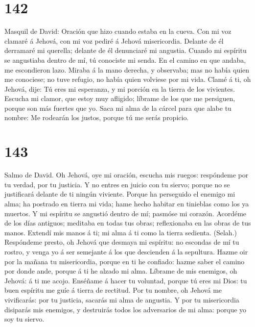 \hypertarget{section-141}{%
\section{142}\label{section-141}}

 Masquil de David: Oración que hizo cuando estaba en la
cueva. Con mi voz clamaré á Jehová, con mi voz pediré á Jehová
misericordia.  Delante de él derramaré mi querella;
delante de él denunciaré mi angustia.  Cuando mi espíritu
se angustiaba dentro de mí, tú conociste mi senda. En el camino en que
andaba, me escondieron lazo.  Miraba á la mano derecha, y
observaba; mas no había quien me conociese; no tuve refugio, no había
quien volviese por mi vida.  Clamé á ti, oh Jehová, dije:
Tú eres mi esperanza, y mi porción en la tierra de los vivientes.
 Escucha mi clamor, que estoy muy afligido; líbrame de los
que me persiguen, porque son más fuertes que yo.  Saca mi
alma de la cárcel para que alabe tu nombre: Me rodearán los justos,
porque tú me serás propicio.

\hypertarget{section-142}{%
\section{143}\label{section-142}}

 Salmo de David. Oh Jehová, oye mi oración, escucha mis
ruegos: respóndeme por tu verdad, por tu justicia.  Y no
entres en juicio con tu siervo; porque no se justificará delante de ti
ningún viviente.  Porque ha perseguido el enemigo mi alma;
ha postrado en tierra mi vida; hame hecho habitar en tinieblas como los
ya muertos.  Y mi espíritu se angustió dentro de mí;
pasmóse mi corazón.  Acordéme de los días antiguos;
meditaba en todas tus obras; reflexionaba en las obras de tus manos.
 Extendí mis manos á ti; mi alma á ti como la tierra
sedienta. (Selah.)  Respóndeme presto, oh Jehová que
desmaya mi espíritu: no escondas de mí tu rostro, y venga yo á ser
semejante á los que descienden á la sepultura.  Hazme oir
por la mañana tu misericordia, porque en ti he confiado: hazme saber el
camino por donde ande, porque á ti he alzado mi alma. 
Líbrame de mis enemigos, oh Jehová: á ti me acojo. 
Enséñame á hacer tu voluntad, porque tú eres mi Dios: tu buen espíritu
me guíe á tierra de rectitud.  Por tu nombre, oh Jehová
me vivificarás: por tu justicia, sacarás mi alma de angustia.
 Y por tu misericordia disiparás mis enemigos, y
destruirás todos los adversarios de mi alma: porque yo soy tu siervo.

